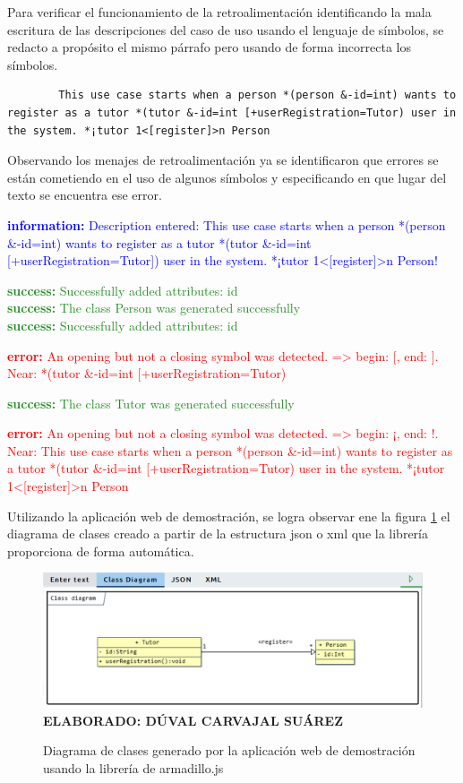\begin{itemize}
	Para verificar el funcionamiento de la retroalimentación identificando la mala escritura de las descripciones del caso de uso usando el lenguaje de símbolos, se redacto a propósito el mismo párrafo pero usando de forma incorrecta los símbolos.
	
	\begin{lstlisting}
		This use case starts when a person *(person &-id=int) wants to register as a tutor *(tutor &-id=int [+userRegistration=Tutor) user in the system. *¡tutor 1<[register]>n Person \end{lstlisting} 
	
	Observando los menajes de retroalimentación ya se identificaron que errores se están cometiendo en el uso de algunos símbolos y especificando en que lugar del texto se encuentra ese error. 
	
	\textcolor{blue}{\textbf{information:} Description entered: This use case starts when a person *(person \&-id=int) wants to register as a tutor *(tutor \&-id=int [+userRegistration=Tutor]) user in the system. *¡tutor 1<[register]>n Person!}
	
	\textcolor{ForestGreen}{
	\textbf{success:} Successfully added attributes: id \\
	\textbf{success:} The class Person was generated successfully \\
	\textbf{success:} Successfully added attributes: id}

	\textcolor{Red}{
	\textbf{error:} An opening but not a closing symbol was detected. => begin: [, end: ]. Near: *(tutor \&-id=int [+userRegistration=Tutor)}

	\textcolor{ForestGreen}{\textbf{success:} The class Tutor was generated successfully }
	
	\textcolor{Red}{
	\textbf{error:}  An opening but not a closing symbol was detected. => begin: ¡, end: !. Near: This use case starts when a person *(person \&-id=int) wants to register as a tutor *(tutor \&-id=int [+userRegistration=Tutor) user in the system. *¡tutor 1<[register]>n Person}

	Utilizando la aplicación web de demostración, se logra observar ene la figura \ref{fig:prueba01} el diagrama de clases creado a partir de la estructura json o xml que la librería proporciona de forma automática. 
	
	\begin{figure}[h!]
		\caption{Diagrama de clases generado por la aplicación web de demostración usando la librería de armadillo.js}
		\includegraphics[width=15cm]{img/prueba01.png}
		\label{fig:prueba01}
		\textbf{\\ ELABORADO: DÚVAL CARVAJAL SUÁREZ}
	\end{figure}
	

\end{itemize}
